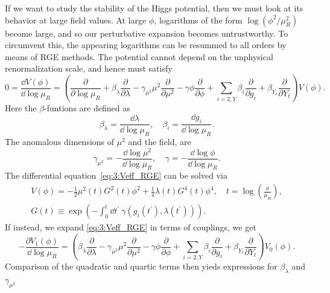 If we want to study the stability of the Higgs potential, then we must look at its behavior at large field values. At large $\phi$, logarithms of the form $\log (\phi^2/\mu_R^2)$ become large, and so our perturbative expansion becomes untrustworthy. To circumvent this, the appearing logarithms can be resummed to all orders by means of \acs{RGE} methods. The potential cannot depend on the unphysical renormalization scale, and hence must satisfy
\begin{equation}
0 = \frac{\dd V(\phi)}{\dd \log \mu_R} = \left( \frac{\partial}{\partial \log \mu_R} + \beta_\lambda \frac{\partial}{\partial \lambda} - \gamma_{\mu^2} \mu^2 \frac{\partial}{\partial \mu^2} - \gamma \phi \frac{\partial}{\partial \phi} + \sum_{i= 2, Y} \beta_i \frac{\partial }{\partial g_i} + \beta_{Y_t} \frac{\partial }{\partial Y_t} \right) V(\phi).
\label{eq:3:Veff_RGE}
\end{equation}
Here the $\beta$-funtions are defined as
\begin{equation}
\beta_\lambda = \frac{\dd \lambda}{\dd \log \mu_R}, \quad \beta_i = \frac{\dd g_i}{\dd \log \mu_R}.
\end{equation}
The anomalous dimensions of $\mu^2$ and the field, are
\begin{equation}
\gamma_{\mu^2} = - \frac{\dd \log \mu^2}{\dd \log \mu_R}, \quad \gamma = - \frac{\dd \log \phi}{\dd \log \mu_R}.
\end{equation}
The differential equation~\eqref{eq:3:Veff_RGE} can be solved via
\begin{equation}
\begin{gathered}
V (\phi) = -\frac{1}{2} \mu^2(t) G^2(t) \phi^2 + \frac{1}{4} \lambda(t) G^4(t) \phi^4, \quad t = \log\left( \frac{\phi}{\mu_R} \right), \\
G(t) \equiv \exp \left(- \int_0^t \dd t^\prime \ \gamma(g_i (t^\prime), \lambda (t^\prime)) \right).
\end{gathered}
\label{eq:3:Veff_solution}
\end{equation}
If instead, we expand \eqref{eq:3:Veff_RGE} in terms of couplings, we get
\begin{equation}
-\frac{\partial V_1(\phi)}{\dd \log \mu_R} = \left( \beta_\lambda \frac{\partial}{\partial \lambda} - \gamma_{\mu^2} \mu^2 \frac{\partial}{\partial \mu^2} - \gamma \phi \frac{\partial}{\partial \phi} + \sum_{i= 2, Y} \beta_i \frac{\partial }{\partial g_i} + \beta_{Y_t} \frac{\partial }{\partial Y_t} \right) V_0(\phi).
\end{equation}
Comparison of the quadratic and quartic terms then yieds expressions for $\beta_\lambda$ and $\gamma_{\mu^2}$
